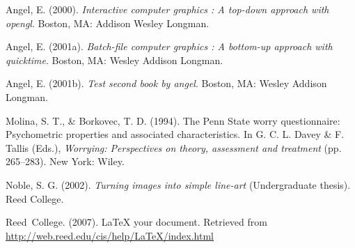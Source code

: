 \documentclass[12pt,twoside]{reedthesis}
\begin{document}
\noindent

\setlength{\parindent}{-0.20in}
\setlength{\leftskip}{0.20in}
\setlength{\parskip}{8pt}

\hypertarget{refs}{}
\leavevmode\hypertarget{ref-angel2000}{}%
Angel, E. (2000). \emph{Interactive computer graphics : A top-down approach with opengl}. Boston, MA: Addison Wesley Longman.

\leavevmode\hypertarget{ref-angel2001}{}%
Angel, E. (2001a). \emph{Batch-file computer graphics : A bottom-up approach with quicktime}. Boston, MA: Wesley Addison Longman.

\leavevmode\hypertarget{ref-angel2002a}{}%
Angel, E. (2001b). \emph{Test second book by angel}. Boston, MA: Wesley Addison Longman.

\leavevmode\hypertarget{ref-Molina1994}{}%
Molina, S. T., \& Borkovec, T. D. (1994). The Penn State worry questionnaire: Psychometric properties and associated characteristics. In G. C. L. Davey \& F. Tallis (Eds.), \emph{Worrying: Perspectives on theory, assessment and treatment} (pp. 265--283). New York: Wiley.

\leavevmode\hypertarget{ref-noble2002}{}%
Noble, S. G. (2002). \emph{Turning images into simple line-art} (Undergraduate thesis). Reed College.

\leavevmode\hypertarget{ref-reedweb2007}{}%
Reed~College. (2007). LaTeX your document. Retrieved from \url{http://web.reed.edu/cis/help/LaTeX/index.html}


\end{document}
